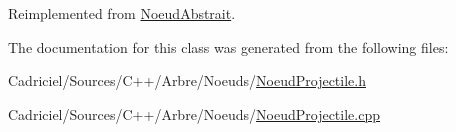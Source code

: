Reimplemented from \hyperlink{group__inf2990_gadc6ebe69894dbb682fdd0ecb1b6c11e9}{Noeud\-Abstrait}.



The documentation for this class was generated from the following files\-:\begin{DoxyCompactItemize}
\item 
Cadriciel/\-Sources/\-C++/\-Arbre/\-Noeuds/\hyperlink{_noeud_projectile_8h}{Noeud\-Projectile.\-h}\item 
Cadriciel/\-Sources/\-C++/\-Arbre/\-Noeuds/\hyperlink{_noeud_projectile_8cpp}{Noeud\-Projectile.\-cpp}\end{DoxyCompactItemize}
